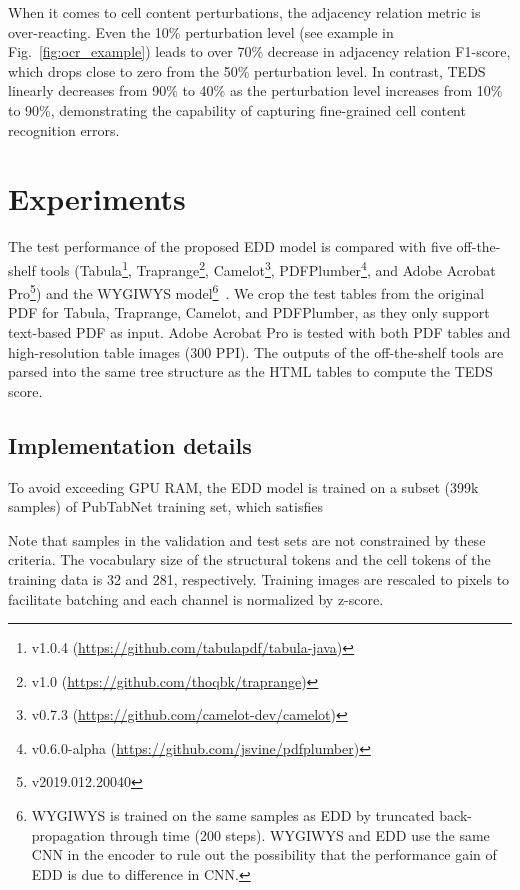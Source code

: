 \documentclass[conference]{IEEEtran}
\begin{document}
When it comes to cell content perturbations, the adjacency relation metric is
over-reacting. Even the 10\% perturbation level (see example in
Fig.~\ref{fig:ocr_example}) leads to over 70\% decrease in
adjacency relation F1-score, which drops close to zero from the 50\%
perturbation level. In contrast, TEDS linearly decreases from 90\% to 40\% as
the perturbation level increases from 10\% to 90\%, demonstrating the capability
of capturing fine-grained cell content recognition errors.


\section{Experiments}

The test performance of the proposed EDD model is compared with five
off-the-shelf tools (Tabula\footnote{v1.0.4
(\url{https://github.com/tabulapdf/tabula-java})}, Traprange\footnote{v1.0
(\url{https://github.com/thoqbk/traprange})}, Camelot\footnote{v0.7.3
(\url{https://github.com/camelot-dev/camelot})},
PDFPlumber\footnote{v0.6.0-alpha (\url{https://github.com/jsvine/pdfplumber})},
and Adobe Acrobat\textsuperscript{\tiny\textregistered}
Pro\footnote{v2019.012.20040}) and the WYGIWYS model\footnote{WYGIWYS is trained
on the same samples as EDD by truncated back-propagation through time (200
steps). WYGIWYS and EDD use the same CNN in the encoder to rule out the
possibility that the performance gain of EDD is due to difference in
CNN.}~\cite{deng2017image}. We crop the test tables from the original PDF for
Tabula, Traprange, Camelot, and PDFPlumber, as they only support text-based PDF
as input. Adobe Acrobat\textsuperscript{\tiny\textregistered} Pro is tested with
both PDF tables and high-resolution table images (300 PPI). The outputs of the
off-the-shelf tools are parsed into the same tree structure as the HTML tables
to compute the TEDS score.

\subsection{Implementation details}

To avoid exceeding GPU RAM, the EDD model is trained on a subset (399k samples)
of PubTabNet training set, which satisfies

Note that samples in the validation and test sets are not constrained by these
criteria. The vocabulary size of the structural tokens and the cell tokens of
the training data is 32 and 281, respectively. Training images are rescaled to
 pixels to facilitate batching and each channel is normalized by
z-score.
\end{document}
